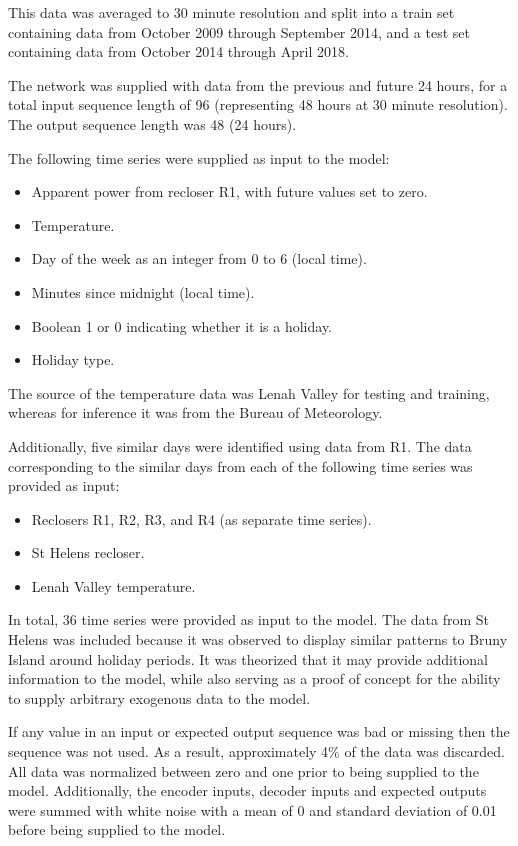 \documentclass[conference]{IEEEtran}
\begin{document}
This data was averaged to 30 minute resolution and split into a train set containing data from October 2009 through September 2014, and a test set containing data from October 2014 through April 2018.

The network was supplied with data from the previous and future 24 hours, for a total input sequence length of 96 (representing 48 hours at 30 minute resolution).
The output sequence length was 48 (24 hours).

The following time series were supplied as input to the model:
\begin{itemize}
	\item Apparent power from recloser R1, with future values set to zero.
	\item Temperature.
	\item Day of the week as an integer from 0 to 6 (local time).
	\item Minutes since midnight (local time).
	\item Boolean 1 or 0 indicating whether it is a holiday.
	\item Holiday type.
\end{itemize}

The source of the temperature data was Lenah Valley for testing and training, whereas for inference it was from the Bureau of Meteorology.

Additionally, five similar days were identified using data from R1.
The data corresponding to the similar days from each of the following time series was provided as input:
\begin{itemize}
	\item Reclosers R1, R2, R3, and R4 (as separate time series).
	\item St Helens recloser.
	\item Lenah Valley temperature.
\end{itemize}

In total, 36 time series were provided as input to the model.
The data from St Helens was included because it was observed to display similar patterns to Bruny Island around holiday periods.
It was theorized that it may provide additional information to the model, while also serving as a proof of concept for the ability to supply arbitrary exogenous data to the model.

If any value in an input or expected output sequence was bad or missing then the sequence was not used.
As a result, approximately 4\% of the data was discarded.
All data was normalized between zero and one prior to being supplied to the model.
Additionally, the encoder inputs, decoder inputs and expected outputs were summed with white noise with a mean of 0 and standard deviation of 0.01 before being supplied to the model.
\end{document}
